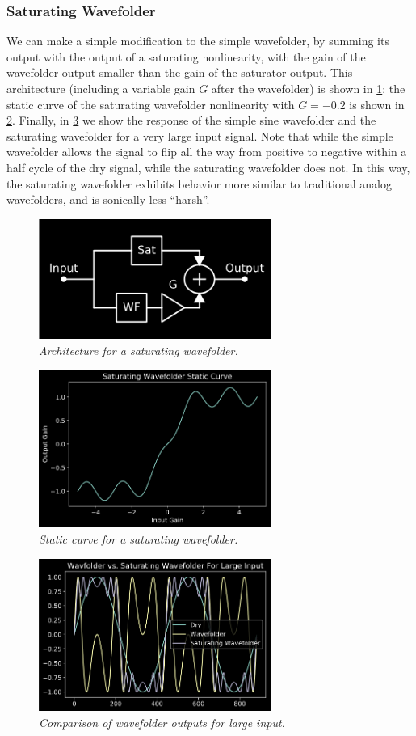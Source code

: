 \documentclass[twoside,a4paper]{article}
\begin{document}
\subsubsection{Saturating Wavefolder}
%
We can make a simple modification to the simple wavefolder, by summing
its output with the output of a saturating nonlinearity, with the gain
of the wavefolder output smaller than the gain of the saturator output.
This architecture (including a variable gain $G$ after the wavefolder) is
shown in \cref{sat_wave}; the static curve of the saturating wavefolder
nonlinearity with $G=-0.2$ is shown in \cref{sat_static}. Finally, in
\cref{sat_wave_large} we show the response of the simple sine wavefolder
and the saturating wavefolder for a very large input signal. Note that
while the simple wavefolder allows the signal to flip all the way from
positive to negative within a half cycle of the dry signal, while the
saturating wavefolder does not. In this way, the saturating wavefolder
exhibits behavior more similar to traditional analog wavefolders, and
is sonically less ``harsh''.
%
\begin{figure}[h]
    \center
    \includegraphics[width=3in]{../Wavefolder/Pics/sat_arch.png}
    \caption{\label{sat_wave}{\it Architecture for a saturating wavefolder.}}
\end{figure}
%
\begin{figure}[h]
    \center
    \includegraphics[width=3in]{../Wavefolder/Pics/sat_static.png}
    \caption{\label{sat_static}{\it Static curve for a saturating wavefolder.}}
\end{figure}
%
\begin{figure}[h]
    \center
    \includegraphics[width=3in]{../Wavefolder/Pics/sat_wave_large.png}
    \caption{\label{sat_wave_large}{\it Comparison of wavefolder outputs for large input.}}
\end{figure}
%
\end{document}
